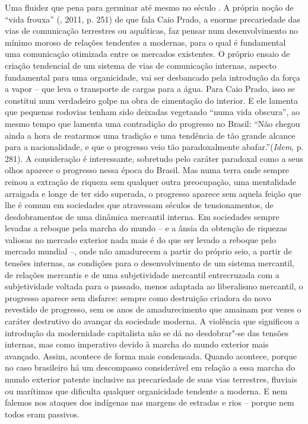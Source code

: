 Uma fluidez que pena para germinar até mesmo no século . A própria
noção de ``vida frouxa'' (, 2011, p. 251) de que fala Caio Prado,
a enorme precariedade das vias de comunicação terrestres ou aquáticas,
faz pensar num desenvolvimento no mínimo moroso de relações tendentes a
modernas, para o qual é fundamental uma comunicação otimizada entre os
mercados existentes. O próprio ensaio de criação tendencial de um
sistema de vias de comunicação internas, aspecto fundamental para uma
organicidade, vai ser desbancado pela introdução da força a vapor -- que
leva o transporte de cargas para a água. Para Caio Prado, isso se
constitui num verdadeiro golpe na obra de cimentação do interior. E ele
lamenta que pequenas rodovias tenham sido deixadas vegetando ``numa vida
obscura'', ao mesmo tempo que lamenta uma contradição do progresso no
Brasil: ``Não chegou ainda a hora de reatarmos uma tradição e uma
tendência de tão grande alcance para a nacionalidade, e que o progresso
veio tão paradoxalmente abafar.''(\emph{Idem}, p. 281). A consideração é
interessante, sobretudo pelo caráter paradoxal como a seus olhos aparece
o progresso nessa época do Brasil. Mas numa terra onde sempre reinou a
extração de riqueza sem qualquer outra preocupação, uma mentalidade
arraigada e longe de ter sido superada, o progresso aparece sem aquela
feição que lhe é comum em sociedades que atravessam séculos de
tensionamentos, de desdobramentos de uma dinâmica mercantil interna. Em
sociedades sempre levadas a reboque pela marcha do mundo -- e a ânsia da
obtenção de riquezas valiosas no mercado exterior nada mais é do que ser
levado a reboque pelo mercado mundial --, onde não amadurecem a partir
do próprio seio, a partir de tensões internas, as condições para o
desenvolvimento de um sistema mercantil, de relações mercantis e de uma
subjetividade mercantil entrecruzada com a subjetividade voltada para o
passado, menos adaptada ao liberalismo mercantil, o progresso aparece
sem disfarce: sempre como destruição criadora do novo revestido de
progresso, sem os anos de amadurecimento que amainam por vezes o caráter
destrutivo do avançar da sociedade moderna. A violência que significou a
introdução da modernidade capitalista não se dá no desdobrar"-se das
tensões internas, mas como imperativo devido à marcha do mundo exterior
mais avançado. Assim, acontece de forma mais condensada. Quando
acontece, porque no caso brasileiro há um descompasso considerável em
relação a essa marcha do mundo exterior patente inclusive na
precariedade de suas vias terrestres, fluviais ou marítimas que
dificulta qualquer organicidade tendente a moderna. E nem falemos nos
ataques dos indígenas nas margens de estradas e rios -- porque nem todos
eram passivos.

